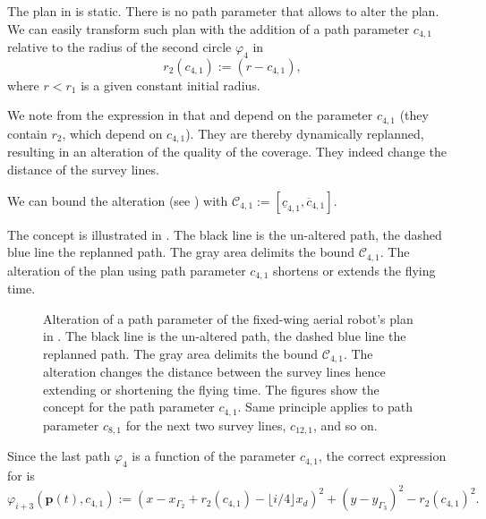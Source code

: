 The plan in  is static. There is no path parameter that allows to alter the plan. We can easily transform such plan with the addition of a path parameter $c_{4,1}$ relative to the radius of the second circle $\varphi_4$ in 
\begin{equation}\label{eq:radius-dynamic}
  r_2(c_{4,1}):=(r-c_{4,1}),
\end{equation}
where $r<r_1$ is a given constant initial radius.

We note from the expression in  that  and  depend on the parameter $c_{4,1}$ (they contain $r_2$, which depend on $c_{4,1}$). They are thereby dynamically replanned, resulting in an alteration of the quality of the coverage. They indeed change the distance of the survey lines.

We can bound the alteration (see ) with $\mathcal{C}_{4,1}:=[\underline{c}_{4,1},\overline{c}_{4,1}]$. 

The concept is illustrated in . The black line is the un-altered path, the dashed blue line the replanned path. The gray area delimits the bound $\mathcal{C}_{4,1}$. The alteration of the plan using path parameter $c_{4,1}$ shortens or extends the flying time.

\begin{figure}[p!]
  \centering
  
  \caption[Alteration of a path parameter of the fixed-wing aerial robot's plan]{Alteration of a path parameter of the fixed-wing aerial robot's plan in . The black line is the un-altered path, the dashed blue line the replanned path. The gray area delimits the bound $\mathcal{C}_{4,1}$. The alteration changes the distance between the survey lines hence extending or shortening the flying time. The figures show the concept for the path parameter $c_{4,1}$. Same principle applies to path parameter $c_{8,1}$ for the next two survey lines, $c_{12,1}$, and so on.}
  \label{fig:plot5}
\end{figure}

Since the last path $\varphi_4$ is a function of the parameter $c_{4,1}$, the correct expression for  is 
\begin{equation}
  \varphi_{i+3}(\mathbf{p}(t),c_{4,1}):=(x-x_{\Gamma_2}+r_2(c_{4,1})-\lfloor i/4\rfloor x_d)^2+(y-y_{\Gamma_3})^2-r_2(c_{4,1})^2.
\end{equation}

